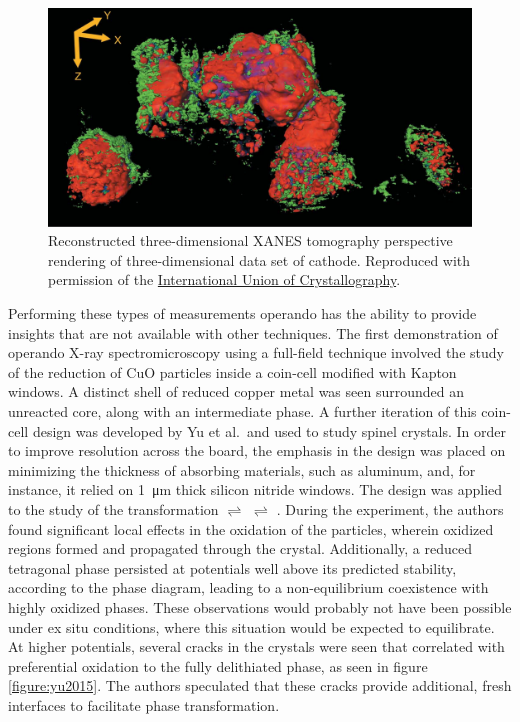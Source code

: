 \documentclass[journal=cmatex,manuscript=perspective]{achemso}
\newcommand{\iucr}{Reproduced with permission of the
  \href{http://journals.iucr.org/}{International Union of
    Crystallography}.}
\begin{document}
\begin{figure}
  \includegraphics[width=\textwidth]{meirer2011.png}
  \caption{Reconstructed three-dimensional XANES tomography
    perspective rendering of three-dimensional data set of 
    cathode.\cite{meirer2011} \iucr}
  \label{figure:meirer2011}
\end{figure}

Performing these types of measurements operando has the ability to
provide insights that are not available with other techniques. The
first demonstration of operando X-ray spectromicroscopy using a
full-field technique involved the study of the reduction of CuO
particles inside a coin-cell modified with Kapton
windows\cite{wang2013}. A distinct shell of reduced copper metal was
seen surrounded an unreacted  core, along with an intermediate
 phase. A further iteration of this coin-cell design was
developed by Yu et al.\ and used to study  spinel
crystals. In order to improve resolution across the board, the
emphasis in the design was placed on minimizing the thickness of
absorbing materials, such as aluminum, and, for instance, it relied on
\SI{1}{\micro\meter} thick silicon nitride windows. The design was
applied to the study of the transformation 
$\rightleftharpoons$  $\rightleftharpoons$
\cite{ohzuku1990}. During the experiment, the authors found
significant local effects in the oxidation of the particles, wherein
oxidized  regions formed and propagated through the
crystal. Additionally, a reduced tetragonal  phase
persisted at potentials well above its predicted stability, according
to the phase diagram, leading to a non-equilibrium coexistence with
highly oxidized phases. These observations would probably not have
been possible under ex situ conditions, where this situation would be
expected to equilibrate. At higher potentials, several cracks in the
crystals were seen that correlated with preferential oxidation to the
fully delithiated  phase, as seen in figure
\ref{figure:yu2015}. The authors speculated that these cracks provide
additional, fresh interfaces to facilitate phase
transformation\cite{yu2015}.
\end{document}
